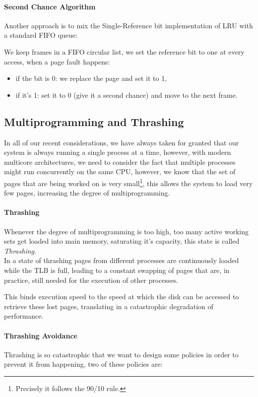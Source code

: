 \documentclass[openright, twoside]{report}
\theoremstyle{definition}
\theoremstyle{example}
\begin{document}
\paragraph{Second Chance Algorithm}
Another approach is to mix the Single-Reference bit implementation of LRU with a standard 
FIFO queue:

We keep frames in a FIFO circular list, we set the reference bit to one at every access, when a page 
fault happens:

\begin{itemize}
	\item if the bit is 0: we replace the page and set it to 1,
	\item if it's 1: set it to 0 (give it a second chance) and move to the next frame.
\end{itemize}

\subsection{Multiprogramming and Thrashing}
In all of our recent considerations, we have always taken for granted that 
our system is always running a single process at a time, however, with modern multicore 
architectures, we need to consider the fact that multiple processes might run concurrently on the same 
CPU, however, we know that the set of pages that are being worked on is very small\footnote{Precisely it follows the 
90/10 rule.}, this allows the system to load very few pages, increasing the degree of multiprogramming.\\

\paragraph{Thrashing}
Whenever the degree of multiprogramming is too high, too many active working sets get 
loaded into main memory, saturating it's capacity, this state is called \emph{Thrashing}.\\ 

In a state of thrashing pages from different processes are continuously loaded while the 
TLB is full, leading to a constant swapping of pages that are, in practice, still needed
for the execution of other processes.

This binds execution speed to the speed at which the disk can be accessed to 
retrieve these lost pages, translating in a catastrophic degradation of performance.

\paragraph{Thrashing Avoidance}
Thrashing is so catastrophic that we want to design some policies in order to 
prevent it from happening, two of these policies are:
\end{document}
